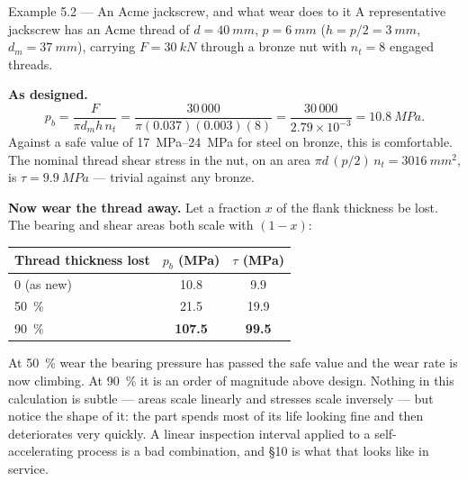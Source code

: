 \documentclass[11pt,a4paper]{article}
\begin{document}
\begin{examplebox}{Example 5.2 --- An Acme jackscrew, and what wear does to it}
A representative jackscrew has an Acme thread of $d = \SI{40}{mm}$, $p = \SI{6}{mm}$
($h = p/2 = \SI{3}{mm}$, $d_m = \SI{37}{mm}$), carrying $F = \SI{30}{kN}$ through a bronze nut with
$n_t = 8$ engaged threads.

\medskip
\textbf{As designed.}
\[
p_b = \frac{F}{\pi d_m h\,n_t} = \frac{30\,000}{\pi(0.037)(0.003)(8)}
= \frac{30\,000}{2.79\times10^{-3}} = \SI{10.8}{MPa}.
\]
Against a safe value of \SIrange{17}{24}{MPa} for steel on bronze, this is comfortable. The nominal
thread shear stress in the nut, on an area $\pi d\,(p/2)\,n_t = \SI{3016}{mm^2}$, is
$\tau = \SI{9.9}{MPa}$ --- trivial against any bronze.

\medskip
\textbf{Now wear the thread away.} Let a fraction $x$ of the flank thickness be lost. The bearing and
shear areas both scale with $(1-x)$:
\begin{center}\small
\begin{tabular}{@{}lcc@{}}
\toprule
Thread thickness lost & $p_b$ (\si{MPa}) & $\tau$ (\si{MPa})\\
\midrule
0 (as new) & 10.8 & 9.9\\
\SI{50}{\percent} & 21.5 & 19.9\\
\SI{90}{\percent} & \textbf{107.5} & \textbf{99.5}\\
\bottomrule
\end{tabular}
\end{center}

\medskip
At \SI{50}{\percent} wear the bearing pressure has passed the safe value and the wear rate is now
climbing. At \SI{90}{\percent} it is an order of magnitude above design. Nothing in this calculation
is subtle --- areas scale linearly and stresses scale inversely --- but notice the shape of it: the
part spends most of its life looking fine and then deteriorates very quickly. A linear inspection
interval applied to a self-accelerating process is a bad combination, and \S10 is what that looks like
in service.
\end{examplebox}
\end{document}
